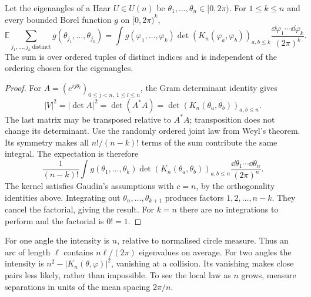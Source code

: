 \begin{theorem}\label{thm:correlations}
Let the eigenangles of a Haar $U\in U(n)$ be
$\theta_1,\ldots,\theta_n\in[0,2\pi)$.
For $1\le k\le n$ and every bounded Borel function $g$ on $[0,2\pi)^k$,
\[
 \mathbb E\sum_{j_1,\ldots,j_k\ \mathrm{distinct}}
       g(\theta_{j_1},\ldots,\theta_{j_k})
 =\int g(\varphi_1,\ldots,\varphi_k)
       \det(K_n(\varphi_a,\varphi_b))_{a,b\le k}
       \frac{\dd\varphi_1\cdots\dd\varphi_k}{(2\pi)^k}.
\]
The sum is over ordered tuples of distinct indices and is independent
of the ordering chosen for the eigenangles.
\end{theorem}
\begin{proof}
For $A=(e^{ij\theta_l})_{0\le j<n,\ 1\le l\le n}$,
the Gram determinant identity gives
\[
 |V|^2=|\det A|^2=\det(A^*A)
       =\det(K_n(\theta_a,\theta_b))_{a,b\le n}.
\]
The last matrix may be transposed relative to $A^*A$; transposition does
not change its determinant.
Use the randomly ordered joint law from Weyl's theorem.
Its symmetry makes all $n!/(n-k)!$ terms of the sum contribute the same
integral. The expectation is therefore
\[
 \frac1{(n-k)!}\int g(\theta_1,\ldots,\theta_k)
       \det(K_n(\theta_a,\theta_b))_{a,b\le n}
       \frac{\dd\theta_1\cdots\dd\theta_n}{(2\pi)^n}.
\]
The kernel satisfies Gaudin's assumptions with $c=n$, by the orthogonality
identities above. Integrating out $\theta_n,\ldots,\theta_{k+1}$
produces factors $1,2,\ldots,n-k$.
They cancel the factorial, giving the result. For $k=n$ there are no
integrations to perform and the factorial is $0!=1$.
\end{proof}

For one angle the intensity is $n$, relative to normalised circle measure.
Thus an arc of length $\ell$ contains $n\ell/(2\pi)$ eigenvalues on
average. For two angles the intensity is
$n^2-|K_n(\theta,\varphi)|^2$, vanishing at a collision.
Its vanishing makes close pairs less likely, rather than impossible.
To see the local law as $n$ grows, measure separations in units of the
mean spacing $2\pi/n$.

